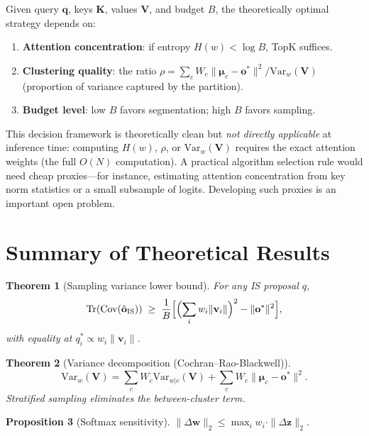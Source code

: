 \documentclass[11pt,a4paper]{article}
\newtheorem{theorem}{Theorem}[section]
\newtheorem{proposition}[theorem]{Proposition}
\theoremstyle{definition}
\newcommand{\vv}{\mathbf{v}}
\newcommand{\qq}{\mathbf{q}}
\newcommand{\oo}{\mathbf{o}}
\newcommand{\ww}{\mathbf{w}}
\newcommand{\zz}{\mathbf{z}}
\newcommand{\bmu}{\boldsymbol{\mu}}
\newcommand{\Var}{\mathrm{Var}}
\newcommand{\Cov}{\mathrm{Cov}}
\newcommand{\Tr}{\mathrm{Tr}}
\begin{document}
Given query $\qq$, keys $\mathbf{K}$, values $\mathbf{V}$, and budget $B$,
the theoretically optimal strategy depends on:

\begin{enumerate}[nosep]
  \item \textbf{Attention concentration}: if entropy
    $H(w) < \log B$, TopK suffices.
  \item \textbf{Clustering quality}: the ratio
    $\rho = \sum_c W_c\|\bmu_c-\oo^*\|^2 / \Var_w(\mathbf{V})$
    (proportion of variance captured by the partition).
  \item \textbf{Budget level}: low $B$ favors segmentation; high $B$ favors
    sampling.
\end{enumerate}

\begin{researchnote}
This decision framework is theoretically clean but \emph{not directly
applicable} at inference time: computing $H(w)$, $\rho$, or $\Var_w(\mathbf{V})$
requires the exact attention weights (the full $O(N)$ computation).  A
practical algorithm selection rule would need cheap proxies---for instance,
estimating attention concentration from key norm statistics or a small
subsample of logits.  Developing such proxies is an important open problem.
\end{researchnote}


\section{Summary of Theoretical Results}\label{sec:summary}

\begin{theorem}[Sampling variance lower bound]
For any IS proposal $q$,
\[
  \Tr(\Cov(\hat{\oo}_{\mathrm{IS}}))
  \;\ge\;
  \frac{1}{B}\Bigl[
    \Bigl(\sum_i w_i\|\vv_i\|\Bigr)^{2} - \|\oo^{*}\|^{2}
  \Bigr],
\]
with equality at $q_i^*\propto w_i\|\vv_i\|$.
\end{theorem}

\begin{theorem}[Variance decomposition (Cochran--Rao-Blackwell)]
\[
  \Var_w(\mathbf{V})
  = \sum_c W_c\Var_{w|c}(\mathbf{V})
  + \sum_c W_c\|\bmu_c - \oo^{*}\|^{2}.
\]
Stratified sampling eliminates the between-cluster term.
\end{theorem}

\begin{proposition}[Softmax sensitivity]
$\|\Delta\ww\|_2 \le \max_i w_i\cdot\|\Delta\zz\|_2$.
\end{proposition}
\end{document}
